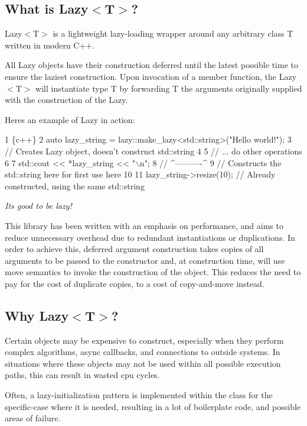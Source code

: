 \subsection*{What is {\ttfamily Lazy$<$T$>$}?}

{\ttfamily Lazy$<$T$>$} is a lightweight lazy-\/loading wrapper around any arbitrary class {\ttfamily T} written in modern C++.

All {\ttfamily Lazy} objects have their construction deferred until the latest possible time to ensure the laziest construction. Upon invocation of a member function, the {\ttfamily Lazy$<$T$>$} will instantiate type {\ttfamily T} by forwarding {\ttfamily T} the arguments originally supplied with the construction of the {\ttfamily Lazy}.

Here\textquotesingle{}s an example of {\ttfamily Lazy} in action\+: 
\begin{DoxyCode}
1 \{c++\}
2 auto lazy\_string = lazy::make\_lazy<std::string>("Hello world!");
3 // Creates Lazy object, doesn't construct std::string
4 
5 // ... do other operations
6 
7 std::cout << *lazy\_string << "\(\backslash\)n"; 
8 //           ^----------^
9 //           Constructs the std::string here for first use here
10 
11 lazy\_string->resize(10); // Already constructed, using the same std::string
\end{DoxyCode}


{\itshape It\textquotesingle{}s good to be lazy!}

This library has been written with an emphasis on performance, and aims to reduce unnecessary overhead due to redundant instantiations or duplications. In order to achieve this, deferred argument construction takes copies of all arguments to be passed to the constructor and, at construction time, will use move semantics to invoke the construction of the object. This reduces the need to pay for the cost of duplicate copies, to a cost of copy-\/and-\/move instead.

\subsection*{Why {\ttfamily Lazy$<$T$>$}?}

Certain objects may be expensive to construct, especially when they perform complex algorithms, async callbacks, and connections to outside systems. In situations where these objects may not be used within all possible execution paths, this can result in wasted cpu cycles.

Often, a lazy-\/initialization pattern is implemented within the class for the specific-\/case where it is needed, resulting in a lot of boilerplate code, and possible areas of failure.

